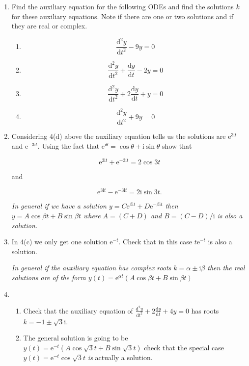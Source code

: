 \documentclass[11pt,a4paper]{article}
\newcommand{\diff}{\mathrm{d}}
\begin{document}
\begin{enumerate}
\item  Find the auxiliary equation for the following ODEs and find the solutions $k$ for these auxiliary equations. Note if there are one or two solutions and if they are real or complex.
\begin{enumerate}
\item $$  \frac{\diff^2 y}{\diff t^2}  -9 y = 0 $$ 
\item $$  \frac{\diff^2 y}{\diff t^2}+  \frac{\diff y}{\diff t} -2 y = 0 $$ 
\item $$  \frac{\diff^2 y}{\diff t^2}+  2\frac{\diff y}{\diff t} + y = 0 $$ 
\item $$  \frac{\diff^2 y}{\diff t^2}  +9 y = 0 $$ 
\end{enumerate}

\item Considering 4(d) above the auxiliary equation tells us the solutions are $\mathrm{e}^{3\mathrm{i}t}$ and $\mathrm{e}^{-3\mathrm{i}t}$.  Using the fact that  $\mathrm{e}^{\mathrm{i}\theta}= \cos \theta + \mathrm{i} \sin\theta$ show that 

$$\mathrm{e}^{3\mathrm{i}t} + \mathrm{e}^{-3\mathrm{i}t} = 2 \cos 3t$$

 and

$$\mathrm{e}^{3\mathrm{i}t} - \mathrm{e}^{-3\mathrm{i}t} = 2\mathrm{i} \sin 3t.$$

{\em In general if we have a solution $ y= C \mathrm{e}^{\beta\mathrm{i}t}  +D \mathrm{e}^{-\beta\mathrm{i}t}$ then $y = A \cos \beta t + B \sin \beta t$ where $A= (C+D)$ and $B = (C-D)/\mathrm{i}$  is also a solution.}

\item In 4(c) we only get one solution $\mathrm{e}^{-t}$. Check that in this case $t\mathrm{e}^{-t}$ is also a solution.

{\em In general if the auxiliary equation has complex roots $k=\alpha \pm \mathrm{i}\beta$ then the real solutions are of the form $y(t)= \mathrm{e}^{\alpha t}\left( A\cos \beta t + B \sin \beta t\right)$ }

\item 
\begin{enumerate}
\item Check that the auxiliary equation of
$\frac{\diff^2 y}{\diff t^2}+ 2 \frac{\diff y}{\diff t} +4 y = 0 $
has roots $k=-1 \pm \sqrt{3}\mathrm{i}$.
\item The general solution is going to be $y(t)= \mathrm{e}^{- t}\left( A\cos \sqrt{3} t + B \sin \sqrt{3} t\right)$ check that the special case $y(t)= \mathrm{e}^{- t}\cos \sqrt{3} t $ {\em is} actually a solution.
\end{enumerate}








\end{enumerate}
\vfill\eject
\end{document}
